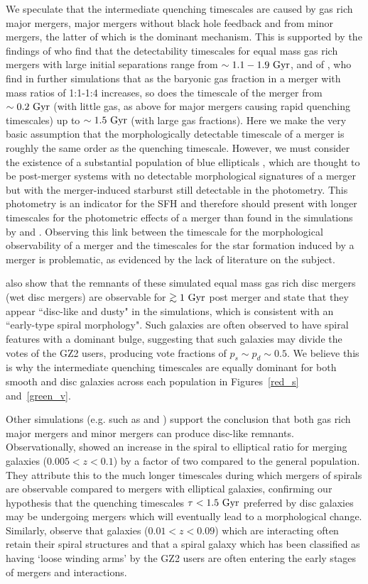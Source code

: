 We speculate that the intermediate quenching timescales are caused by gas rich major mergers, major mergers without black hole feedback and from minor mergers, the latter of which is the dominant mechanism. This is supported by the findings of \citet{lotz08b} who find that the detectability timescales for equal mass gas rich mergers with large initial separations range from $\sim 1.1-1.9~\rm{Gyr}$, and of \citet{Lotz11}, who find in further simulations that as the baryonic gas fraction in a merger with mass ratios of 1:1-1:4 increases, so does the timescale of the merger from $\sim0.2~\rm{Gyr}$ (with little gas, as above for major mergers causing rapid quenching timescales) up to $\sim1.5~\rm{Gyr}$ (with large gas fractions). Here we make the very basic assumption that the morphologically detectable timescale of a merger is roughly the same order as the quenching timescale. However, we must consider the existence of a substantial population of blue ellipticals \citep{Sch09}, which are thought to be post-merger systems with no detectable morphological signatures of a merger but with the merger-induced starburst still detectable in the photometry. This photometry is an indicator for the SFH and therefore should present with longer timescales for the photometric effects of a merger than found in the simulations by \citet{lotz08b} and \citet{Lotz11}. Observing this link between the timescale for the morphological observability of a merger and the timescales for the star formation induced by a merger is problematic, as evidenced by the lack of literature on the subject.

\citet{lotz08b} also show that the remnants of these simulated equal mass gas rich disc mergers (wet disc mergers) are observable for $\gtrsim1~\rm{Gyr}$ post merger and state that they appear ``disc-like and dusty" in the simulations, which is consistent with an ``early-type spiral morphology".  Such galaxies are often observed to have spiral features with a dominant bulge, suggesting that such galaxies may divide the votes of the GZ2 users, producing vote fractions of $p_s \sim p_d \sim 0.5$. We believe this is why the intermediate quenching timescales are equally dominant for both smooth and disc galaxies across each population in Figures~\ref{red_s} and~\ref{green_v}. 

Other simulations (e.g. such as \citet{robertson06} and \citet{Barnes02}) support the conclusion that both gas rich major mergers and minor mergers can produce disc-like remnants. Observationally, \citet{Darg10a} showed an increase in the spiral to elliptical ratio for merging galaxies ($0.005 < z < 0.1$) by a factor of two compared to the general population. They attribute this to the much longer timescales during which mergers of spirals are observable compared to mergers with elliptical galaxies, confirming our hypothesis that the quenching timescales $\tau < 1.5 ~\rm{Gyr}$ preferred by disc galaxies may be undergoing mergers which will eventually lead to a morphological change. Similarly, \citet{Casteels13} observe that galaxies ($0.01 < z < 0.09$) which are interacting often retain their spiral structures and that a spiral galaxy which has been classified as having `loose winding arms' by the GZ2 users are often entering the early stages of mergers and interactions.


